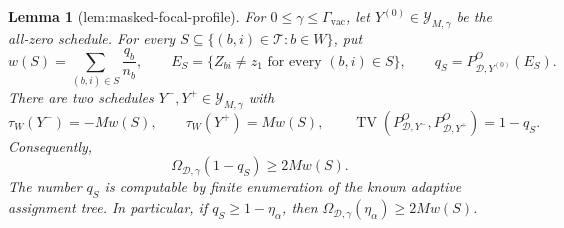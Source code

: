 \documentclass{article}
\newtheorem{lemma}{Lemma}
\begin{document}
\begin{lemma}[lem:masked-focal-profile]\label{lem:masked-focal-profile}
For \(0\le\gamma\le\Gamma_{\mathrm{vac}}\), let \(Y^{(0)}\in\mathcal Y_{M,\gamma}\) be the all-zero schedule.  For every \(S\subseteq\{(b,i)\in\mathcal T:b\in W\}\), put
\[
 w(S)=\sum_{(b,i)\in S}\frac{q_b}{n_b},
 \qquad
 E_S=\{Z_{bi}\ne z_1\text{ for every }(b,i)\in S\},
 \qquad
 q_S=P^O_{\mathcal D,Y^{(0)}}(E_S).
\]
There are two schedules \(Y^-,Y^+\in\mathcal Y_{M,\gamma}\) with
\[
 \tau_W(Y^-)=-Mw(S),
 \qquad
 \tau_W(Y^+)=Mw(S),
 \qquad
 \operatorname{TV}\!\left(P^O_{\mathcal D,Y^-},P^O_{\mathcal D,Y^+}\right)=1-q_S.
\]
Consequently,
\[
 \Omega_{\mathcal D,\gamma}(1-q_S)\ge2Mw(S).
\]
The number \(q_S\) is computable by finite enumeration of the known adaptive assignment tree.  In particular, if \(q_S\ge1-\eta_\alpha\), then \(\Omega_{\mathcal D,\gamma}(\eta_\alpha)\ge2Mw(S)\).
\end{lemma}
\end{document}

